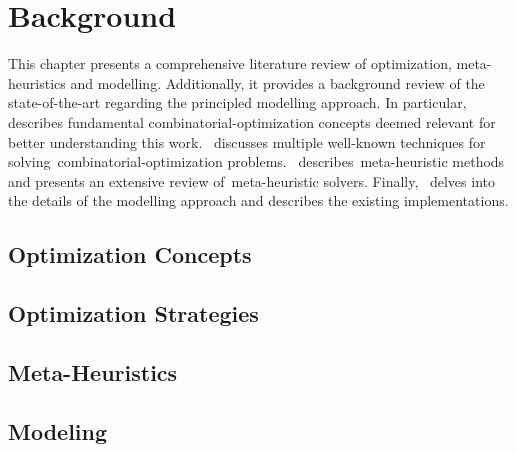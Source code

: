 \chapter{Background}
\label{ch:background}


This chapter presents a comprehensive literature review of optimization,
meta-heuristics and modelling. Additionally, it provides a background review of
the state-of-the-art regarding the principled modelling approach. In
particular,~ describes fundamental
\acrshort{combinatorial-optimization} concepts deemed relevant for better
understanding this work.~ discusses multiple well-known techniques for
solving~\acrshort{combinatorial-optimization}
problems.~ describes~\acrshort{meta-heuristic} methods
and presents an extensive review of~\acrshort{meta-heuristic} solvers.
Finally,~ delves into the details of the modelling approach
and describes the existing implementations.

\section{Optimization Concepts}
\label{sec:optimization-concepts}


\section{Optimization Strategies}
\label{sec:optimization-strategies}


\section{Meta-Heuristics}
\label{sec:meta-heuristics}


\section{Modeling}
\label{sec:modelling}
